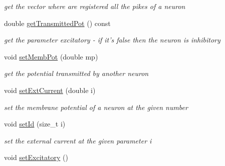 \begin{DoxyCompactItemize}
\begin{DoxyCompactList}\small\item\em get the vector where are registered all the pikes of a neuron \end{DoxyCompactList}\item 
double \hyperlink{classNeuron_a2910a30501fcedfd35aff8e323bcb436}{get\-Transmitted\-Pot} () const 
\begin{DoxyCompactList}\small\item\em get the parameter excitatory -\/ if it's false then the neuron is inhibitory \end{DoxyCompactList}\item 
void \hyperlink{classNeuron_a05ef2a79941a8d93e1a4a60defd4e121}{set\-Memb\-Pot} (double mp)
\begin{DoxyCompactList}\small\item\em get the potential transmitted by another neuron \end{DoxyCompactList}\item 
\hypertarget{classNeuron_ad3505ba8e55d64e7144e1d83337c2ed4}{void \hyperlink{classNeuron_ad3505ba8e55d64e7144e1d83337c2ed4}{set\-Ext\-Current} (double i)}\label{classNeuron_ad3505ba8e55d64e7144e1d83337c2ed4}

\begin{DoxyCompactList}\small\item\em set the membrane potential of a neuron at the given number \end{DoxyCompactList}\item 
\hypertarget{classNeuron_a222df129e8f40309034052b85447d603}{void \hyperlink{classNeuron_a222df129e8f40309034052b85447d603}{set\-Id} (size\-\_\-t i)}\label{classNeuron_a222df129e8f40309034052b85447d603}

\begin{DoxyCompactList}\small\item\em set the external current at the given parameter i \end{DoxyCompactList}\item 
\hypertarget{classNeuron_aee068e79e1a8c1ef0be8548dc6728b18}{void \hyperlink{classNeuron_aee068e79e1a8c1ef0be8548dc6728b18}{set\-Excitatory} ()}\label{classNeuron_aee068e79e1a8c1ef0be8548dc6728b18}


\end{DoxyCompactItemize}
